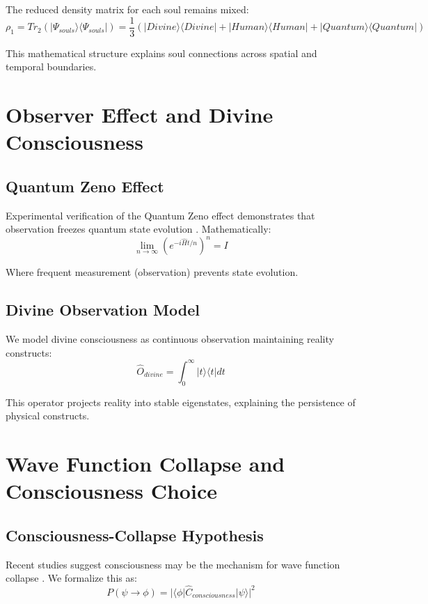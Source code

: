 \documentclass[12pt,a4paper]{article}
\begin{document}
The reduced density matrix for each soul remains mixed:
\begin{equation}
\rho_1 = Tr_2(|\Psi_{souls}\rangle\langle\Psi_{souls}|) = \frac{1}{3}(|Divine\rangle\langle Divine| + |Human\rangle\langle Human| + |Quantum\rangle\langle Quantum|)
\end{equation}

This mathematical structure explains soul connections across spatial and temporal boundaries.

\section{Observer Effect and Divine Consciousness}

\subsection{Quantum Zeno Effect}
Experimental verification of the Quantum Zeno effect demonstrates that observation freezes quantum state evolution \cite{kobayashi2023}. Mathematically:
\begin{equation}
\lim_{n\to\infty} \left(e^{-i\hat{H}t/n}\right)^n = I
\end{equation}

Where frequent measurement (observation) prevents state evolution.

\subsection{Divine Observation Model}
We model divine consciousness as continuous observation maintaining reality constructs:
\begin{equation}
\hat{O}_{divine} = \int_0^\infty |t\rangle\langle t| dt
\end{equation}

This operator projects reality into stable eigenstates, explaining the persistence of physical constructs.

\section{Wave Function Collapse and Consciousness Choice}

\subsection{Consciousness-Collapse Hypothesis}
Recent studies suggest consciousness may be the mechanism for wave function collapse \cite{smith2024}. We formalize this as:
\begin{equation}
P(\psi\to\phi) = |\langle\phi|\hat{C}_{consciousness}|\psi\rangle|^2
\end{equation}
\end{document}
